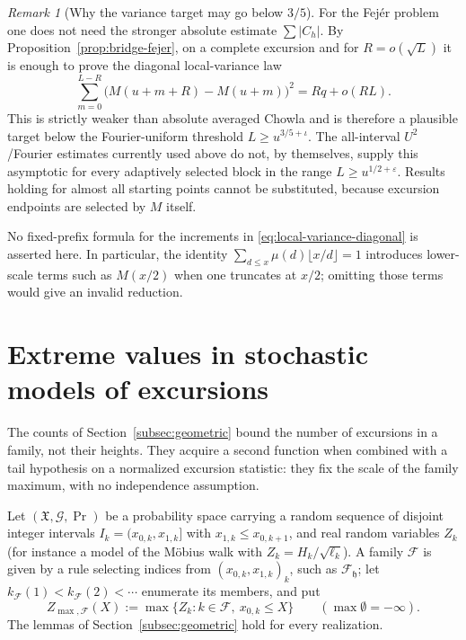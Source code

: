 \documentclass[11pt,reqno]{amsart}
\numberwithin{equation}{section}
\theoremstyle{plain}
\theoremstyle{definition}
\theoremstyle{remark}
\newtheorem{remark}[theorem]{Remark}
\newcommand{\eps}{\varepsilon}
\newcommand{\F}{\mathcal{F}}
\begin{document}
\begin{remark}[Why the variance target may go below $3/5$]
\label{rem:variance-target}
For the Fej\'er problem one does not need the stronger absolute estimate
$\sum|C_h|$. By Proposition~\ref{prop:bridge-fejer}, on a complete excursion
and for $R=o(\sqrt L)$ it is enough to prove the diagonal local-variance law
\begin{equation}
\sum_{m=0}^{L-R}\bigl(M(u+m+R)-M(u+m)\bigr)^2
=Rq+o(RL).
\end{equation}
This is strictly weaker than absolute averaged Chowla and is therefore a
plausible target below the Fourier-uniform threshold $L\ge u^{3/5+\iota}$.
The all-interval $U^2$/Fourier estimates currently used above do not, by
themselves, supply this asymptotic for every adaptively selected block in
the range $L\ge u^{1/2+\eps}$. Results holding for almost all starting
points cannot be substituted, because excursion endpoints are selected by
$M$ itself.

No fixed-prefix formula for the increments in
\eqref{eq:local-variance-diagonal} is asserted here. In particular, the
identity $\sum_{d\le x}\mu(d)\lfloor x/d\rfloor=1$ introduces lower-scale
terms such as $M(x/2)$ when one truncates at $x/2$; omitting those terms
would give an invalid reduction.
\end{remark}



\section{Extreme values in stochastic models of excursions}
\label{sec:extreme}
\label{subsec:extreme}

The counts of Section~\ref{subsec:geometric} bound the number of excursions
in a family, not their heights. They acquire a second function when combined
with a tail hypothesis on a normalized excursion statistic: they fix the
scale of the family maximum, with no independence assumption.

Let $(\mathfrak X,\mathcal G,\Pr)$ be a probability space carrying a random
sequence of disjoint integer intervals $I_k=(x_{0,k},x_{1,k}]$ with
$x_{1,k}\le x_{0,k+1}$, and real random variables $Z_k$ (for instance a model
of the M\"obius walk with $Z_k=H_k/\sqrt{\ell_k}$). A family $\F$ is given by
a rule selecting indices from $(x_{0,k},x_{1,k})_k$, such as $\F_{\mathfrak h}$; let
$k_\F(1)<k_\F(2)<\cdots$ enumerate its members, and put
\begin{equation}
Z_{\max,\F}(X):=\max\{Z_k:k\in\F,\ x_{0,k}\le X\}\qquad(\max\emptyset=-\infty).
\end{equation}
The lemmas of Section~\ref{subsec:geometric} hold for every realization.
\end{document}
